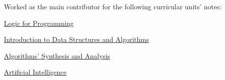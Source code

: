 \documentclass[]{deedy-resume-openfont}
\begin{document}
\begin{minipage}[t]{0.66\textwidth}
  \sectionsep

  Worked as the main contributor for the following curricular units' notes:
  \vspace{\topsep} %
  \begin{tightemize}
    \item \href{https://resumos.leic.pt/lp}{Logic for Programming}
    \item \href{https://resumos.leic.pt/iaed}{Introduction to Data Structures and Algorithms}
    \item \href{https://resumos.leic.pt/asa}{Algorithms' Synthesis and Analysis}
    \item \href{https://resumos.leic.pt/ia}{Artificial Intelligence}
  \end{tightemize}

\end{minipage}
\end{document}
